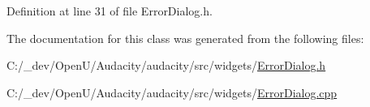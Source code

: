 Definition at line 31 of file Error\+Dialog.\+h.



The documentation for this class was generated from the following files\+:\begin{DoxyCompactItemize}
\item 
C\+:/\+\_\+dev/\+Open\+U/\+Audacity/audacity/src/widgets/\hyperlink{_error_dialog_8h}{Error\+Dialog.\+h}\item 
C\+:/\+\_\+dev/\+Open\+U/\+Audacity/audacity/src/widgets/\hyperlink{_error_dialog_8cpp}{Error\+Dialog.\+cpp}\end{DoxyCompactItemize}
